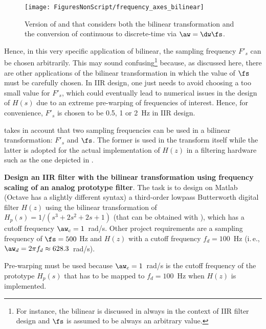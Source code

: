 \begin{figure}
\centering
\texttt{[image: FiguresNonScript/frequency\_axes\_bilinear]}
\caption{Version of  and  that considers both 
the bilinear transformation and the conversion of continuous to discrete-time via $\aw=\dw \fs$.\label{fig:frequency_axes_bilinear}}
\end{figure}

Hence, in this very specific application of bilinear, the sampling frequency $F'_s$ can be chosen arbitrarily. This may sound confusing\footnote{For instance, the bilinear is discussed in \cite{Oppenheim09} always in the context of IIR filter design and $\fs$ is assumed to be always an arbitrary value.} because, as discussed here, there are other applications of the bilinear transformation in which the value of $\fs$ must be carefully chosen.
In IIR design, one just needs to avoid choosing a too small value for $F'_s$, which could eventually lead to numerical issues in the design of $H(s)$ due to an extreme pre-warping of frequencies of interest.
 Hence, for convenience, $F'_s$ is chosen to be 0.5, 1 or 2~Hz in IIR design.

 takes in account that two
sampling frequencies can be used in a bilinear transformation: $F'_s$ and $\fs$.
The former is used in the transform itself while the latter
is adopted for the actual implementation of $H(z)$ in a filtering hardware such as the one depicted in .

\bExample \textbf{Design an IIR filter with the bilinear transformation using frequency scaling of an analog prototype filter}.
The task is to design on Matlab (Octave has a slightly different syntax) a third-order lowpass Butterworth digital filter $H(z)$ using the bilinear transformation of
$H_p(s) = 1/(s^3+2s^2+2s+1)$ (that can be obtained with ), which has a cutoff frequency $\aw_c = 1$~rad/s.
Other project requirements are a sampling frequency of $\fs=500$ Hz and $H(z)$ with a cutoff frequency $f_d = 100$~Hz (i.\,e., $\aw_d = 2\pi f_d \approx 628.3$~rad/s).

Pre-warping must be used because $\aw_c=1$~rad/s is the cutoff frequency of the prototype $H_p(s)$ that 
has to be mapped to $f_d=100$~Hz when $H(z)$ is implemented.


